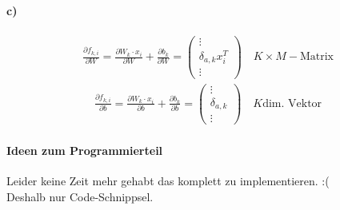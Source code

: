 \paragraph{c)}
\begin{gather}
\frac{\partial f_{k,i}}{\partial W} =\frac{\partial W_k \cdot x_i}{\partial W} +\frac{\partial b_{k}}{\partial W}= 
\begin{pmatrix}
\vdots \\
\delta_{a ,k} x_i ^T \\
\vdots
\end{pmatrix}
\quad K\times M -\text{Matrix}
\end{gather}
\begin{gather}
\frac{\partial f_{k,i}}{\partial b} = 
\frac{\partial W_k \cdot x_i}{\partial b} +\frac{\partial b_{k}}{\partial b}=
\begin{pmatrix}
\vdots \\
\delta_{a ,k} \\
\vdots
\end{pmatrix}
\quad K \text{dim. Vektor}
\end{gather}

\paragraph{Ideen zum Programmierteil}
Leider keine Zeit mehr gehabt das komplett zu implementieren. :(  \\
Deshalb nur Code-Schnippsel. 


